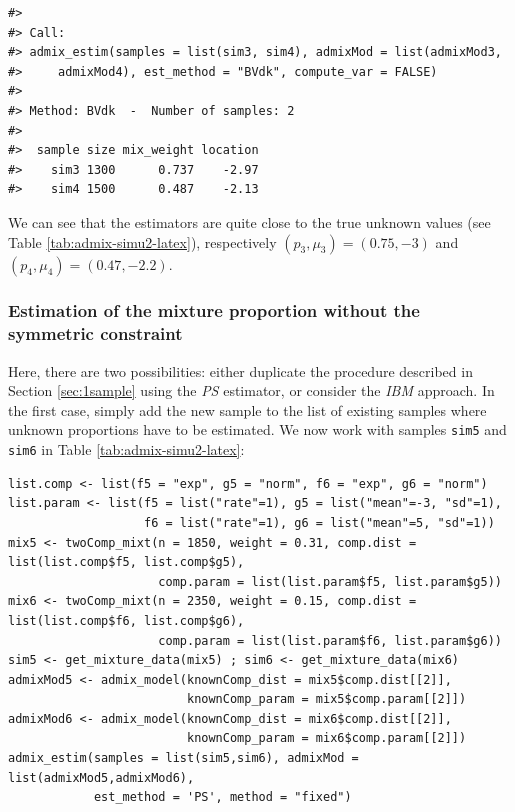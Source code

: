 \begin{verbatim}
#> 
#> Call:
#> admix_estim(samples = list(sim3, sim4), admixMod = list(admixMod3, 
#>     admixMod4), est_method = "BVdk", compute_var = FALSE)
#> 
#> Method: BVdk  -  Number of samples: 2 
#> 
#>  sample size mix_weight location
#>    sim3 1300      0.737    -2.97
#>    sim4 1500      0.487    -2.13
\end{verbatim}

We can see that the estimators are quite close to the true unknown values (see Table \ref{tab:admix-simu2-latex}), respectively \((p_3, \mu_3) = (0.75, -3)\) and \((p_4, \mu_4) = (0.47, -2.2)\).

\subsubsection{Estimation of the mixture proportion without the symmetric constraint}\label{estimation-of-the-mixture-proportion-without-the-symmetric-constraint-1}

Here, there are two possibilities: either duplicate the procedure described in Section \ref{sec:1sample} using the \emph{PS} estimator, or consider the \emph{IBM} approach. In the first case, simply add the new sample to the list of existing samples where unknown proportions have to be estimated. We now work with samples \texttt{sim5} and \texttt{sim6} in Table \ref{tab:admix-simu2-latex}:

\begin{verbatim}
list.comp <- list(f5 = "exp", g5 = "norm", f6 = "exp", g6 = "norm")
list.param <- list(f5 = list("rate"=1), g5 = list("mean"=-3, "sd"=1),
                   f6 = list("rate"=1), g6 = list("mean"=5, "sd"=1))
mix5 <- twoComp_mixt(n = 1850, weight = 0.31, comp.dist = list(list.comp$f5, list.comp$g5),
                     comp.param = list(list.param$f5, list.param$g5))
mix6 <- twoComp_mixt(n = 2350, weight = 0.15, comp.dist = list(list.comp$f6, list.comp$g6),
                     comp.param = list(list.param$f6, list.param$g6))
sim5 <- get_mixture_data(mix5) ; sim6 <- get_mixture_data(mix6)
admixMod5 <- admix_model(knownComp_dist = mix5$comp.dist[[2]],
                         knownComp_param = mix5$comp.param[[2]])
admixMod6 <- admix_model(knownComp_dist = mix6$comp.dist[[2]],
                         knownComp_param = mix6$comp.param[[2]])
admix_estim(samples = list(sim5,sim6), admixMod = list(admixMod5,admixMod6),
            est_method = 'PS', method = "fixed")
\end{verbatim}


